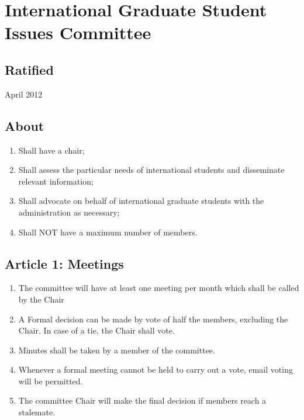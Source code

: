 \section{International Graduate Student Issues Committee}
\subsection{Ratified}
April 2012
\subsection{About}
\begin{enumerate}
\item Shall have a chair;
\item Shall assess the particular needs of international students and disseminate relevant information;
\item Shall advocate on behalf of international graduate students with the administration as necessary;
\item Shall NOT have a maximum number of members. %
\end{enumerate}
\subsection{Article 1: Meetings}
\begin{enumerate}
\item The committee will have at least one meeting per month which shall be called by the Chair
\item A Formal decision can be made by vote of half the members, excluding the Chair. In case of a tie, the Chair shall vote.
\item Minutes shall be taken by a member of the committee.
\item Whenever a formal meeting cannot be held to carry out a vote, email voting will be permitted.
\item The committee Chair will make the final decision if members reach a stalemate.
\end{enumerate}
